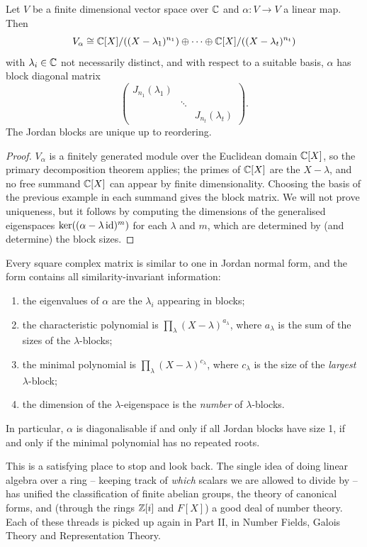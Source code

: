 \documentclass[a4paper]{scrartcl}
\begin{document}
\begin{theorem}
	Let $V$ be a finite dimensional vector space over $\mathbb{C}$ and $\alpha: V \rightarrow V$ a linear map. Then
	$$
	V_{\alpha} \cong \mathbb{C}[X]/((X - \lambda_1)^{n_1}) \oplus \cdots \oplus \mathbb{C}[X]/((X - \lambda_t)^{n_t})
	$$
	with $\lambda_i \in \mathbb{C}$ not necessarily distinct, and with respect to a suitable basis, $\alpha$ has block diagonal matrix
	$$
	\begin{pmatrix}
		J_{n_1}(\lambda_1) & & \\
		& \ddots & \\
		& & J_{n_t}(\lambda_t)
	\end{pmatrix}.
	$$
	The Jordan blocks are unique up to reordering.
\end{theorem}
\begin{proof}
	$V_{\alpha}$ is a finitely generated module over the Euclidean domain $\mathbb{C}[X]$, so the primary decomposition theorem applies; the primes of $\mathbb{C}[X]$ are the $X - \lambda$, and no free summand $\mathbb{C}[X]$ can appear by finite dimensionality. Choosing the basis of the previous example in each summand gives the block matrix. We will not prove uniqueness, but it follows by computing the dimensions of the generalised eigenspaces $\operatorname{ker}((\alpha - \lambda\operatorname{id})^m)$ for each $\lambda$ and $m$, which are determined by (and determine) the block sizes.
\end{proof}

\begin{remark}
	Every square complex matrix is similar to one in Jordan normal form, and the form contains all similarity-invariant information:
	\begin{enumerate}[label=(\roman*)]
		\item the eigenvalues of $\alpha$ are the $\lambda_i$ appearing in blocks;
		\item the characteristic polynomial is $\prod_{\lambda}(X - \lambda)^{a_\lambda}$, where $a_{\lambda}$ is the sum of the sizes of the $\lambda$-blocks;
		\item the minimal polynomial is $\prod_{\lambda}(X - \lambda)^{c_\lambda}$, where $c_{\lambda}$ is the size of the \emph{largest} $\lambda$-block;
		\item the dimension of the $\lambda$-eigenspace is the \emph{number} of $\lambda$-blocks.
	\end{enumerate}
	In particular, $\alpha$ is diagonalisable if and only if all Jordan blocks have size 1, if and only if the minimal polynomial has no repeated roots.
\end{remark}

This is a satisfying place to stop and look back. The single idea of doing linear algebra over a ring -- keeping track of \emph{which} scalars we are allowed to divide by -- has unified the classification of finite abelian groups, the theory of canonical forms, and (through the rings $\mathbb{Z}[i]$ and $F[X]$) a good deal of number theory. Each of these threads is picked up again in Part II, in Number Fields, Galois Theory and Representation Theory.
\end{document}
